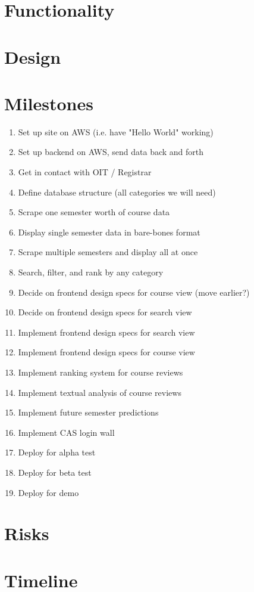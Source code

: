 \documentclass[11pt]{article}
\begin{document}
\section{Functionality}

\section{Design}

\section{Milestones}
\begin{enumerate}
\item Set up site on AWS (i.e. have "Hello World" working)
\item Set up backend on AWS, send data back and forth
\item Get in contact with OIT / Registrar
\item Define database structure (all categories we will need)
\item Scrape one semester worth of course data
\item Display single semester data in bare-bones format
\item Scrape multiple semesters and display all at once
\item Search, filter, and rank by any category
\item Decide on frontend design specs for course view (move earlier?)
\item Decide on frontend design specs for search view
\par [No particular order from here on out]
\item Implement frontend design specs for search view
\item Implement frontend design specs for course view
\item Implement ranking system for course reviews
\item Implement textual analysis of course reviews
\item Implement future semester predictions
\item Implement CAS login wall
\item Deploy for alpha test
\item Deploy for beta test
\item Deploy for demo
\end{enumerate}
\section{Risks}

\section{Timeline}
\end{document}
